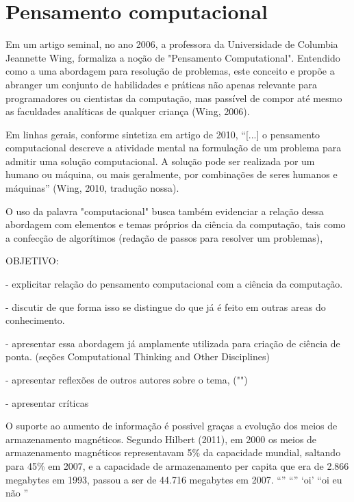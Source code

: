 \documentclass{book}
\begin{document}
\chapter{Pensamento computacional}


Em um artigo seminal, no ano 2006,  a professora da Universidade de Columbia 
Jeannette Wing, formaliza a noção de "Pensamento Computational". Entendido como a uma abordagem para resolução de problemas, este conceito
e propõe a abranger um conjunto de habilidades e práticas não apenas relevante para programadores ou cientistas da computação, mas passível de compor até mesmo as
faculdades analíticas de qualquer criança (Wing, 2006).

Em linhas gerais, conforme sintetiza em artigo de 2010, ``[...] o pensamento 
computacional descreve a atividade mental na formulação de um problema para admitir 
uma solução computacional. A solução pode ser realizada por um humano ou máquina, 
ou mais geralmente, por combinações de seres humanos e máquinas'' (Wing, 2010, tradução nossa).

O uso da palavra "computacional" busca também evidenciar a relação dessa abordagem 
com elementos e temas próprios da ciência da computação, tais como a confecção de algorítimos (redação de passos para resolver um problemas), 


OBJETIVO: 

- explicitar relação do pensamento computacional com a ciência da computação.

- discutir de que forma isso se distingue do que já é feito em outras areas do conhecimento.

- apresentar essa abordagem já amplamente utilizada para criação de ciência de ponta. (seções Computational Thinking and Other Disciplines) 

- apresentar reflexões de outros autores sobre o tema, ("") 

- apresentar críticas

O suporte ao aumento de informação é possivel graças a evolução dos meios de
armazenamento magnéticos. Segundo Hilbert (2011), em 2000 os meios de armazenamento
magnéticos representavam 5\% da capacidade mundial, saltando para 45\% em 2007, e a
capacidade de armazenamento per capita que era de 2.866 megabytes em 1993, passou a ser
de 44.716 megabytes em 2007. 
``''
``''
`oi'
``oi eu não ''
\end{document}

